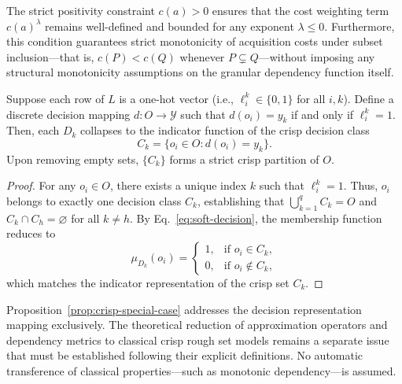 The strict positivity constraint $c(a) > 0$ ensures that the cost weighting term $c(a)^\lambda$ remains well-defined and bounded for any exponent $\lambda \le 0$. Furthermore, this condition guarantees strict monotonicity of acquisition costs under subset inclusion—that is, $c(P) < c(Q)$ whenever $P \subsetneq Q$—without imposing any structural monotonicity assumptions on the granular dependency function itself.

\begin{proposition}
	\label{prop:crisp-special-case}
	Suppose each row of $L$ is a one-hot vector (i.e., $\ell_i^k \in \{0, 1\}$ for all $i, k$). Define a discrete decision mapping $d: O \to \mathcal{Y}$ such that $d(o_i) = y_k$ if and only if $\ell_i^k = 1$. Then, each $D_k$ collapses to the indicator function of the crisp decision class
	\[
	C_k = \{o_i \in O : d(o_i) = y_k\}.
	\]
	Upon removing empty sets, $\{C_k\}$ forms a strict crisp partition of $O$.
\end{proposition}
\begin{proof}
	For any $o_i \in O$, there exists a unique index $k$ such that $\ell_i^k = 1$. Thus, $o_i$ belongs to exactly one decision class $C_k$, establishing that $\bigcup_{k=1}^q C_k = O$ and $C_k \cap C_h = \varnothing$ for all $k \neq h$. By Eq.~\eqref{eq:soft-decision}, the membership function reduces to
	\[
	\mu_{D_k}(o_i) = 
	\begin{cases}
		1, & \text{if } o_i \in C_k, \\
		0, & \text{if } o_i \notin C_k,
	\end{cases}
	\]
	which matches the indicator representation of the crisp set $C_k$.
\end{proof}

Proposition~\ref{prop:crisp-special-case} addresses the decision representation mapping exclusively. The theoretical reduction of approximation operators and dependency metrics to classical crisp rough set models remains a separate issue that must be established following their explicit definitions. No automatic transference of classical properties—such as monotonic dependency—is assumed.
